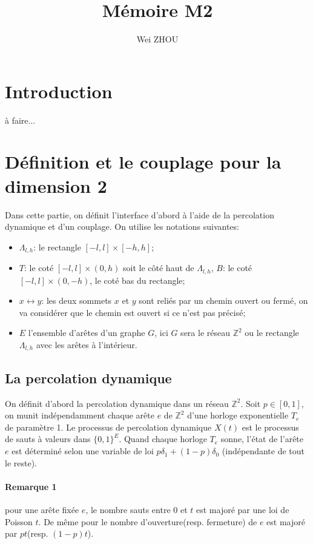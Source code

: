 \documentclass[titlepage,a4paper,11pt]{article}
\title{Mémoire M2}
\author{Wei ZHOU}
\begin{document}
\maketitle

\section{Introduction}
à faire...

\section{Définition et le couplage pour la dimension 2}
Dans cette partie, on définit l'interface d'abord à l'aide de la percolation dynamique et d'un couplage. On utilise les notations suivantes:
\begin{itemize}
\item $\Lambda_{l,h}$: le rectangle $[-l,l]\times[-h,h]$;
\item $T$: le coté $[-l,l]\times(0,h)$ soit le côté haut de $\Lambda_{l,h}$, $B$: le coté $[-l,l]\times(0,-h)$, le coté bas du rectangle;
\item $x\leftrightarrow y$: les deux sommets $x$ et $y$ sont reliés par un chemin ouvert ou fermé, on va considérer que le chemin est ouvert si ce n'est pas précisé;
\item $E$ l'ensemble d'arêtes d'un graphe $G$, ici $G$ sera le réseau $\mathbb{Z}^2$ ou le rectangle $\Lambda_{l,h}$ avec les arêtes à l'intérieur.
\end{itemize}
\subsection{La percolation dynamique}
On définit d'abord la percolation dynamique dans un réseau $\mathbb{Z}^2$. 
Soit $p\in [0,1]$, on munit indépendamment chaque arête $e$ de $\mathbb{Z}^2$ d'une horloge exponentielle $T_e$ de paramètre 1. Le processus de percolation dynamique $X(t)$ est le processus de sauts à valeurs dans $\{0,1\}^E$. Quand chaque horloge $T_e$ sonne, l'état de l'arête $e$ est déterminé selon une variable de loi $p\delta_1+(1-p)\delta_0$ (indépendante de tout le reste). 

\paragraph{Remarque 1} pour une arête fixée $e$, le nombre sauts entre $0$ et $t$ est majoré par une loi de Poisson $t$. De même pour le nombre d'ouverture(resp. fermeture) de $e$ est majoré par $pt$(resp. $(1-p)t$).
\end{document}
